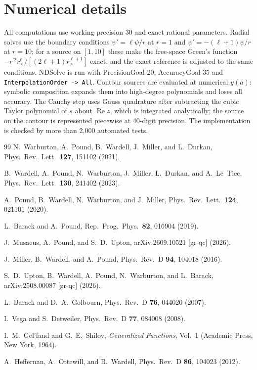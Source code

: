 \documentclass[aps,prl,twocolumn,superscriptaddress,nofootinbib,floatfix]{revtex4-2}
\renewcommand{\Re}{\operatorname{Re}}
\begin{document}
\section{Numerical details}\label{app:numerics}
All computations use working precision 30 and exact rational parameters.
Radial solves use the boundary conditions $\psi'=\ell\psi/r$ at $r=1$ and $\psi'=-(\ell+1)\psi/r$ at $r=10$; for a source on $[1,10]$ these make the free-space Green's function $-r^{\prime2}r_<^\ell/[(2\ell+1)r_>^{\ell+1}]$ exact, and the exact reference is adjusted to the same conditions.
NDSolve is run with PrecisionGoal 20, AccuracyGoal 35 and \texttt{InterpolationOrder -> All}.
Contour sources are evaluated at numerical $y(a)$: symbolic composition expands them into high-degree polynomials and loses all accuracy.
The Cauchy step uses Gauss quadrature after subtracting the cubic Taylor polynomial of $s$ about $\Re z$, which is integrated analytically; the source on the contour is represented piecewise at 40-digit precision.
The implementation is checked by more than 2,000 automated tests.

\begin{thebibliography}{99}
N.~Warburton, A.~Pound, B.~Wardell, J.~Miller, and L.~Durkan,
Phys.\ Rev.\ Lett.\ \textbf{127}, 151102 (2021).

B.~Wardell, A.~Pound, N.~Warburton, J.~Miller, L.~Durkan, and A.~Le~Tiec,
Phys.\ Rev.\ Lett.\ \textbf{130}, 241402 (2023).

A.~Pound, B.~Wardell, N.~Warburton, and J.~Miller,
Phys.\ Rev.\ Lett.\ \textbf{124}, 021101 (2020).

L.~Barack and A.~Pound,
Rep.\ Prog.\ Phys.\ \textbf{82}, 016904 (2019).

J.~Musaeus, A.~Pound, and S.~D.~Upton,
arXiv:2609.10521 [gr-qc] (2026).

J.~Miller, B.~Wardell, and A.~Pound,
Phys.\ Rev.\ D \textbf{94}, 104018 (2016).

S.~D.~Upton, B.~Wardell, A.~Pound, N.~Warburton, and L.~Barack,
arXiv:2508.00087 [gr-qc] (2026).

L.~Barack and D.~A.~Golbourn,
Phys.\ Rev.\ D \textbf{76}, 044020 (2007).

I.~Vega and S.~Detweiler,
Phys.\ Rev.\ D \textbf{77}, 084008 (2008).

I.~M.~Gel'fand and G.~E.~Shilov,
\emph{Generalized Functions}, Vol.~1 (Academic Press, New York, 1964).

A.~Heffernan, A.~Ottewill, and B.~Wardell,
Phys.\ Rev.\ D \textbf{86}, 104023 (2012).

\end{thebibliography}
\end{document}
